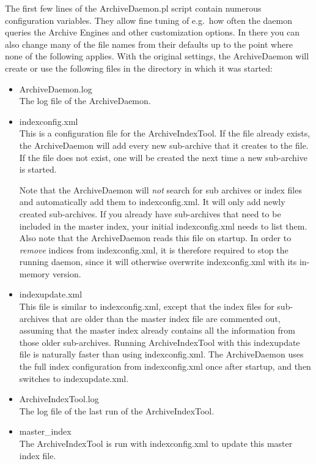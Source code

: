 \noindent The first few lines of the ArchiveDaemon.pl script contain
numerous configuration variables. They allow fine tuning of e.g.\ how
often the daemon queries the Archive Engines and other customization
options. In there you can also change many of the file names from
their defaults up to the point where none of the following
applies. With the original settings, the ArchiveDaemon will create or
use the following files in the directory in which it was started:
\begin{itemize}
\item ArchiveDaemon.log\\
  The log file of the ArchiveDaemon.
\item indexconfig.xml\\
  This is a configuration file for the ArchiveIndexTool.  If the file
  already exists, the ArchiveDaemon will add every new sub-archive
  that it creates to the file. If the file does not exist, one will be
  created the next time a new sub-archive is started.

  Note that the ArchiveDaemon will \emph{not} search for sub archives
  or index files and automatically add them to indexconfig.xml. It
  will only add newly created sub-archives. If you already have
  sub-archives that need to be included in the master index, your
  initial indexconfig.xml needs to list them.
  Also note that the ArchiveDaemon reads this file on startup. In
  order to \emph{remove} indices from indexconfig.xml, it is therefore
  required to stop the running daemon, since it will otherwise
  overwrite indexconfig.xml with its in-memory version.
\item indexupdate.xml\\
  This file is similar to indexconfig.xml, except that the index files
  for sub-archives that are older than the master index file are
  commented out, assuming that the master index already contains all
  the information from those older sub-archives.
  Running ArchiveIndexTool with this indexupdate file is naturally faster
  than using indexconfig.xml. The ArchiveDaemon uses the full index
  configuration from indexconfig.xml once after startup, and then
  switches to indexupdate.xml.
\item ArchiveIndexTool.log\\
  The log file of the last run of the ArchiveIndexTool.
\item master\_index\\
  The ArchiveIndexTool is run with indexconfig.xml to update
  this master index file.
\end{itemize}

